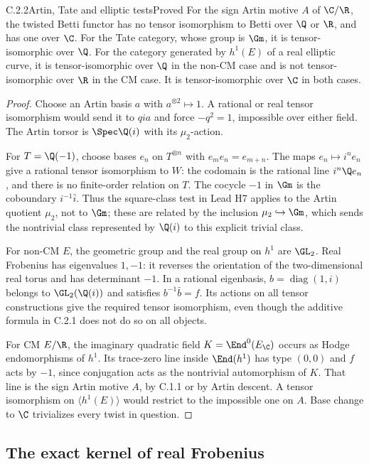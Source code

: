 \begin{result}{C.2.2}{Artin, Tate and elliptic tests}{Proved}
For the sign Artin motive $A$ of $\C/\R$, the twisted Betti functor has no tensor isomorphism to Betti over $\Q$ or $\R$, and has one over $\C$. For the Tate category, whose group is $\Gm$, it is tensor-isomorphic over $\Q$. For the category generated by $h^1(E)$ of a real elliptic curve, it is tensor-isomorphic over $\Q$ in the non-CM case and is not tensor-isomorphic over $\R$ in the CM case. It is tensor-isomorphic over $\C$ in both cases.
\end{result}
\begin{proof}
Choose an Artin basis $a$ with $a^{\otimes2}\mapsto1$. A rational or real tensor isomorphism would send it to $qi a$ and force $-q^2=1$, impossible over either field. The Artin torsor is $\Spec\Q(i)$ with its $\mu_2$-action.

For $T=\Q(-1)$, choose bases $e_n$ on $T^{\otimes n}$ with $e_m e_n=e_{m+n}$. The maps $e_n\mapsto i^ne_n$ give a rational tensor isomorphism to $W$: the codomain is the rational line $i^n\Q e_n$, and there is no finite-order relation on $T$. The cocycle $-1$ in $\Gm$ is the coboundary $i^{-1}\bar i$. Thus the square-class test in Lead H7 applies to the Artin quotient $\mu_2$, not to $\Gm$; these are related by the inclusion $\mu_2\hookrightarrow\Gm$, which sends the nontrivial class represented by $\Q(i)$ to this explicit trivial class.

For non-CM $E$, the geometric group and the real group on $h^1$ are $\GL_2$. Real Frobenius has eigenvalues $1,-1$: it reverses the orientation of the two-dimensional real torus and has determinant $-1$. In a rational eigenbasis, $b=\operatorname{diag}(1,i)$ belongs to $\GL_2(\Q(i))$ and satisfies $b^{-1}\bar b=f$. Its actions on all tensor constructions give the required tensor isomorphism, even though the additive formula in C.2.1 does not do so on all objects.

For CM $E/\R$, the imaginary quadratic field $K=\End^0(E_\C)$ occurs as Hodge endomorphisms of $h^1$. Its trace-zero line inside $\End(h^1)$ has type $(0,0)$ and $f$ acts by $-1$, since conjugation acts as the nontrivial automorphism of $K$. That line is the sign Artin motive $A$, by C.1.1 or by Artin descent. A tensor isomorphism on $\langle h^1(E)\rangle$ would restrict to the impossible one on $A$. Base change to $\C$ trivializes every twist in question.
\end{proof}

\subsection{The exact kernel of real Frobenius}

